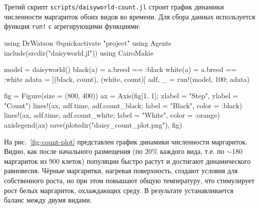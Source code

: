 \documentclass[
  12pt,
  a4paper,
  DIV=11,
  numbers=noendperiod]{scrreprt}
\newenvironment{Shaded}{\begin{snugshade}}{\end{snugshade}}
\newcommand{\BuiltInTok}[1]{\textcolor[rgb]{0.00,0.23,0.31}{#1}}
\newcommand{\FloatTok}[1]{\textcolor[rgb]{0.68,0.00,0.00}{#1}}
\newcommand{\FunctionTok}[1]{\textcolor[rgb]{0.28,0.35,0.67}{#1}}
\newcommand{\ImportTok}[1]{\textcolor[rgb]{0.00,0.46,0.62}{#1}}
\newcommand{\NormalTok}[1]{\textcolor[rgb]{0.00,0.23,0.31}{#1}}
\newcommand{\OperatorTok}[1]{\textcolor[rgb]{0.37,0.37,0.37}{#1}}
\newcommand{\PreprocessorTok}[1]{\textcolor[rgb]{0.68,0.00,0.00}{#1}}
\newcommand{\StringTok}[1]{\textcolor[rgb]{0.13,0.47,0.30}{#1}}
\begin{document}
Третий скрипт \texttt{scripts/daisyworld-count.jl} строит график
динамики численности маргариток обоих видов во времени. Для сбора данных
используется функция \texttt{run!} с агрегирующими функциями:

\begin{Shaded}
\begin{Highlighting}[]
\ImportTok{using} \BuiltInTok{DrWatson}
\PreprocessorTok{@quickactivate} \StringTok{"project"}
\ImportTok{using} \BuiltInTok{Agents}
\FunctionTok{include}\NormalTok{(}\FunctionTok{srcdir}\NormalTok{(}\StringTok{"daisyworld.jl"}\NormalTok{))}
\ImportTok{using} \BuiltInTok{CairoMakie}

\NormalTok{model }\OperatorTok{=} \FunctionTok{daisyworld}\NormalTok{()}
\FunctionTok{black}\NormalTok{(a) }\OperatorTok{=}\NormalTok{ a.breed }\OperatorTok{==} \OperatorTok{:}\NormalTok{black}
\FunctionTok{white}\NormalTok{(a) }\OperatorTok{=}\NormalTok{ a.breed }\OperatorTok{==} \OperatorTok{:}\NormalTok{white}
\NormalTok{adata }\OperatorTok{=}\NormalTok{ [(black, count), (white, count)]}
\NormalTok{adf, \_ }\OperatorTok{=} \FunctionTok{run!}\NormalTok{(model, }\FloatTok{100}\NormalTok{; adata)}

\NormalTok{fig }\OperatorTok{=} \FunctionTok{Figure}\NormalTok{(size }\OperatorTok{=}\NormalTok{ (}\FloatTok{800}\NormalTok{, }\FloatTok{400}\NormalTok{))}
\NormalTok{ax }\OperatorTok{=} \FunctionTok{Axis}\NormalTok{(fig[}\FloatTok{1}\NormalTok{, }\FloatTok{1}\NormalTok{];}
\NormalTok{    xlabel }\OperatorTok{=} \StringTok{"Step"}\NormalTok{, ylabel }\OperatorTok{=} \StringTok{"Count"}\NormalTok{)}
\FunctionTok{lines!}\NormalTok{(ax, adf.time, adf.count\_black;}
\NormalTok{    label }\OperatorTok{=} \StringTok{"Black"}\NormalTok{, color }\OperatorTok{=} \OperatorTok{:}\NormalTok{black)}
\FunctionTok{lines!}\NormalTok{(ax, adf.time, adf.count\_white;}
\NormalTok{    label }\OperatorTok{=} \StringTok{"White"}\NormalTok{, color }\OperatorTok{=} \OperatorTok{:}\NormalTok{orange)}
\FunctionTok{axislegend}\NormalTok{(ax)}
\FunctionTok{save}\NormalTok{(}\FunctionTok{plotsdir}\NormalTok{(}\StringTok{"daisy\_count\_plot.png"}\NormalTok{), fig)}
\end{Highlighting}
\end{Shaded}

На рис.~\ref{fig-count-plot} представлен график динамики численности
маргариток. Видно, как после начального размещения (по 20\% каждого
вида, т.е. по \(\sim 180\) маргариток из 900 клеток) популяции быстро
растут и достигают динамического равновесия. Чёрные маргаритки, нагревая
поверхность, создают условия для собственного роста, но при этом
повышают общую температуру, что стимулирует рост белых маргариток,
охлаждающих среду. В результате устанавливается баланс между двумя
видами.
\end{document}

